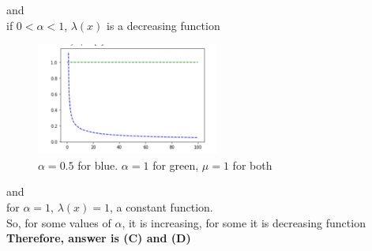 \documentclass[journal,12pt,twocolumn]{IEEEtran}
\begin{document}
and\\ if $0<\alpha<1$, $\lambda(x)$ is a decreasing function
\begin{figure}[htp]
    \centering
    \includegraphics[width=6cm]{alphales1.png}
    \caption{$\alpha=0.5$ for blue. $\alpha=1$ for green, $\mu=1$ for both}
    \label{fig:les1}
\end{figure}
and\\ for $\alpha=1$, $\lambda(x)=1$, a constant function.\\
So, for some values of $\alpha$, it is increasing, for some it is decreasing function\\
\textbf{Therefore, answer is (C) and (D)}
\end{document}
